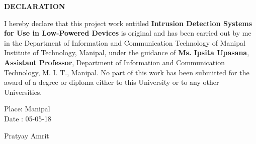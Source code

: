 \begin{center}
\large{\textbf{DECLARATION}}\\
\vspace{1cm}
\end{center}

I hereby declare that this project work entitled \textbf{Intrusion Detection Systems for Use in Low-Powered Devices} is original and has been carried out by
me in the Department of Information and Communication Technology of Manipal Institute of Technology, Manipal, under the guidance of \textbf{Ms. Ipsita Upasana}, \textbf{Assistant Professor}, Department of Information and Communication Technology, M. I. T., Manipal. No part of this work has been submitted for the award of a degree or diploma either to this University or to any other Universities.

\vspace{2cm}

\begin{flushleft}
Place: Manipal\\
Date : 05-05-18
\end{flushleft}


\begin{flushright}
Pratyay Amrit
\end{flushright}
